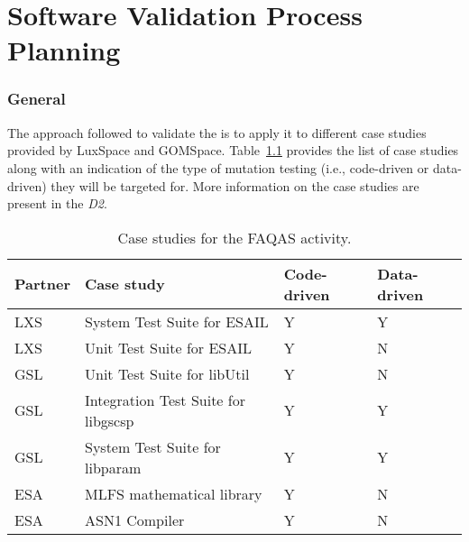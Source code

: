 
\chapter{Software Validation Process Planning}

\subsection{General}

The approach followed to validate the \FAQAS is to apply it to different case studies provided by LuxSpace and GOMSpace.
Table~\ref{tab:caseStudies} provides the list of case studies along with an indication of the type of mutation testing (i.e., code-driven or data-driven) they will be targeted for. More information on the case studies are present in the \emph{D2}.

\begin{table}[htp]
\caption{Case studies for the FAQAS activity.}
\label{tab:caseStudies}
\begin{center}
\begin{tabular}{|p{1.2cm}|p{6cm}|p{2.5cm}|p{2.5cm}|}
\hline
\textbf{Partner}&\textbf{Case study}&\textbf{Code-driven}&\textbf{Data-driven}\\
\hline
LXS&System Test Suite for ESAIL&Y&Y\\
LXS&Unit Test Suite for ESAIL&Y&N\\
GSL&Unit Test Suite for libUtil&Y&N\\
GSL&Integration Test Suite for libgscsp&Y&Y\\
GSL&System Test Suite for libparam&Y&Y\\
ESA&MLFS mathematical library&Y&N\\
ESA&ASN1 Compiler&Y&N\\
\hline
\end{tabular}
\end{center}
\end{table}

\clearpage

